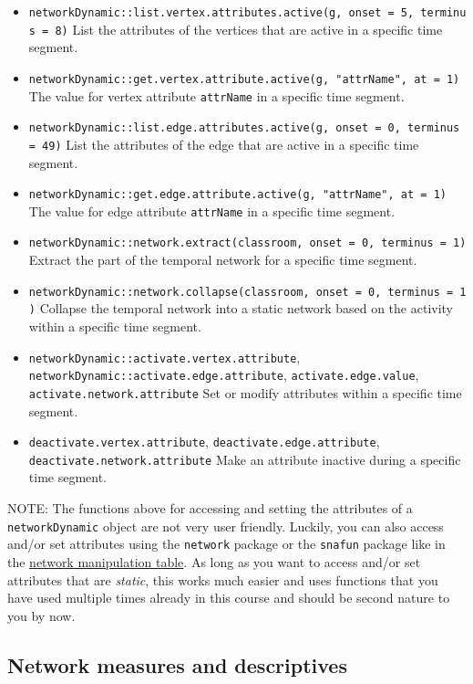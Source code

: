 \documentclass[
]{article}
\begin{document}
\begin{itemize}
\item
  \texttt{networkDynamic::list.vertex.attributes.active(g,\ onset\ =\ 5,\ terminus\ =\ 8)}
  List the attributes of the vertices that are active in a specific time
  segment.
\item
  \texttt{networkDynamic::get.vertex.attribute.active(g,\ "attrName",\ at\ =\ 1)}
  The value for vertex attribute \texttt{attrName} in a specific time
  segment.
\item
  \texttt{networkDynamic::list.edge.attributes.active(g,\ onset\ =\ 0,\ terminus\ =\ 49)}
  List the attributes of the edge that are active in a specific time
  segment.
\item
  \texttt{networkDynamic::get.edge.attribute.active(g,\ "attrName",\ at\ =\ 1)}
  The value for edge attribute \texttt{attrName} in a specific time
  segment.
\item
  \texttt{networkDynamic::network.extract(classroom,\ onset\ =\ 0,\ terminus\ =\ 1)}
  Extract the part of the temporal network for a specific time segment.
\item
  \texttt{networkDynamic::network.collapse(classroom,\ onset\ =\ 0,\ terminus\ =\ 1)}
  Collapse the temporal network into a static network based on the
  activity within a specific time segment.
\item
  \texttt{networkDynamic::activate.vertex.attribute},
  \texttt{networkDynamic::activate.edge.attribute},
  \texttt{activate.edge.value}, \texttt{activate.network.attribute} Set
  or modify attributes within a specific time segment.
\item
  \texttt{deactivate.vertex.attribute},
  \texttt{deactivate.edge.attribute},
  \texttt{deactivate.network.attribute} Make an attribute inactive
  during a specific time segment.
\end{itemize}

NOTE: The functions above for accessing and setting the attributes of a
\texttt{networkDynamic} object are not very user friendly. Luckily, you
can also access and/or set attributes using the \texttt{network} package
or the \texttt{snafun} package like in the
\protect\hyperlink{manipulateux5cux257D}{network manipulation table}. As
long as you want to access and/or set attributes that are \emph{static},
this works much easier and uses functions that you have used multiple
times already in this course and should be second nature to you by now.

\hypertarget{network-measures-and-descriptives}{%
\subsection{Network measures and
descriptives}\label{network-measures-and-descriptives}}
\end{document}
